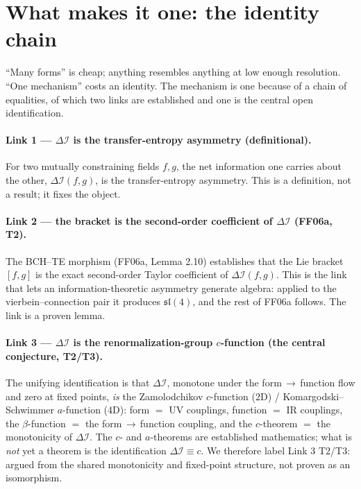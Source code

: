 \documentclass[11pt,a4paper]{article}
\newcommand{\dI}{\Delta\mathcal{I}}
\newcommand{\Tw}{\textsf{T2}}
\newcommand{\Th}{\textsf{T3}}
\newcommand{\paper}[1]{\textsf{#1}}
\theoremstyle{definition}
\theoremstyle{plain}
\begin{document}
\section{What makes it one: the identity chain}\label{sec:identity}

``Many forms'' is cheap; anything resembles anything at low enough resolution. ``One mechanism''
costs an identity. The mechanism is one because of a chain of equalities, of which two links are
established and one is the central open identification.

\paragraph{Link 1 --- $\dI$ is the transfer-entropy asymmetry (definitional).}
For two mutually constraining fields $f,g$, the net information one carries about the other,
$\dI(f,g)$, is the transfer-entropy asymmetry. This is a definition, not a result; it fixes the
object.

\paragraph{Link 2 --- the bracket is the second-order coefficient of $\dI$ (\paper{FF06a}, \Tw).}
The BCH--TE morphism (\paper{FF06a}, Lemma 2.10) establishes that the Lie bracket $[f,g]$ is the
exact second-order Taylor coefficient of $\dI(f,g)$. This is the link that lets an
information-theoretic asymmetry generate algebra: applied to the vierbein--connection pair it
produces $\mathfrak{sl}(4)$, and the rest of \paper{FF06a} follows. The link is a proven lemma.

\paragraph{Link 3 --- $\dI$ is the renormalization-group $c$-function (the central conjecture,
\Tw/\Th).}
The unifying identification is that $\dI$, monotone under the form\,$\to$\,function flow and zero at
fixed points, \emph{is} the Zamolodchikov $c$-function (2D) / Komargodski--Schwimmer $a$-function
(4D): form $=$ UV couplings, function $=$ IR couplings, the $\beta$-function $=$ the
form\,$\to$\,function coupling, and the $c$-theorem $=$ the monotonicity of $\dI$. The $c$- and
$a$-theorems are established mathematics; what is \emph{not} yet a theorem is the identification
$\dI \equiv c$. We therefore label Link 3 \Tw/\Th: argued from the shared monotonicity and
fixed-point structure, not proven as an isomorphism.
\end{document}
